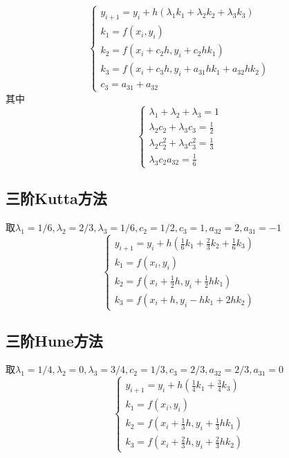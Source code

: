 \begin{equation*}
    \begin{cases}
        y_{i+1}=y_i+h(\lambda_1k_1+\lambda_2k_2+\lambda_3k_3)\\
        k_1=f(x_i,y_i)\\
        k_2=f(x_i+c_2h,y_i+c_2hk_1)\\
        k_3=f(x_i+c_3h,y_i+a_{31}hk_1+a_{32}hk_2)\\
        c_3=a_{31}+a_{32}
    \end{cases}
\end{equation*}
其中
\begin{equation*}
    \begin{cases}
        \lambda_1+\lambda_2+\lambda_3=1\\
        \lambda_2c_2+\lambda_3c_3=\frac{1}{2}\\
        \lambda_2c_2^2+\lambda_3c_3^2=\frac{1}{3}\\
        \lambda_3c_2a_{32}=\frac{1}{6}
    \end{cases}
\end{equation*}

\subsection{三阶Kutta方法}
取$\lambda_1=1/6,\lambda_2=2/3,\lambda_3=1/6,c_2=1/2,c_3=1,a_{32}=2,a_{31}=-1$
\begin{equation*}
    \begin{cases}
        y_{i+1}=y_i+h\left(\frac{1}{6}k_1+\frac{2}{3}k_2+\frac{1}{6}k_3\right)\\
        k_1=f(x_i,y_i)\\
        k_2=f(x_i+\frac{1}{2}h,y_i+\frac{1}{2}hk_1)\\
        k_3=f(x_i+h,y_i-hk_1+2hk_2)
    \end{cases}
\end{equation*}

\subsection{三阶Hune方法}
取$\lambda_1=1/4,\lambda_2=0,\lambda_3=3/4,c_2=1/3,c_3=2/3,a_{32}=2/3,a_{31}=0$
\begin{equation*}
    \begin{cases}
        y_{i+1}=y_i+h\left(\frac{1}{4}k_1+\frac{3}{4}k_3\right)\\
        k_1=f(x_i,y_i)\\
        k_2=f(x_i+\frac{1}{3}h,y_i+\frac{1}{3}hk_1)\\
        k_3=f(x_i+\frac{2}{3}h,y_i+\frac{2}{3}hk_2)
    \end{cases}
\end{equation*}

